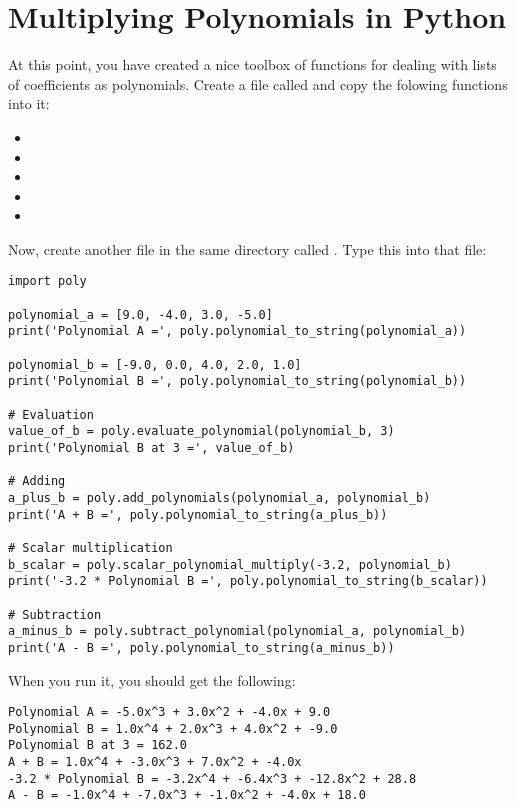 \chapter{Multiplying Polynomials in Python}

At this point, you have created a nice toolbox of functions for
dealing with lists of coefficients as polynomials. Create a file called  and copy the folowing functions into it:
\begin{itemize}
\item {}
\item {}
\item {}
\item {}
\item {}
\end{itemize}

Now, create another file in the same directory called . Type this into that file:
\begin{Verbatim}
import poly

polynomial_a = [9.0, -4.0, 3.0, -5.0]
print('Polynomial A =', poly.polynomial_to_string(polynomial_a))

polynomial_b = [-9.0, 0.0, 4.0, 2.0, 1.0]
print('Polynomial B =', poly.polynomial_to_string(polynomial_b))

# Evaluation
value_of_b = poly.evaluate_polynomial(polynomial_b, 3)
print('Polynomial B at 3 =', value_of_b)

# Adding
a_plus_b = poly.add_polynomials(polynomial_a, polynomial_b)
print('A + B =', poly.polynomial_to_string(a_plus_b))

# Scalar multiplication
b_scalar = poly.scalar_polynomial_multiply(-3.2, polynomial_b)
print('-3.2 * Polynomial B =', poly.polynomial_to_string(b_scalar))

# Subtraction
a_minus_b = poly.subtract_polynomial(polynomial_a, polynomial_b)
print('A - B =', poly.polynomial_to_string(a_minus_b))
\end{Verbatim}

When you run it, you should get the following:
\begin{Verbatim}
Polynomial A = -5.0x^3 + 3.0x^2 + -4.0x + 9.0
Polynomial B = 1.0x^4 + 2.0x^3 + 4.0x^2 + -9.0
Polynomial B at 3 = 162.0
A + B = 1.0x^4 + -3.0x^3 + 7.0x^2 + -4.0x
-3.2 * Polynomial B = -3.2x^4 + -6.4x^3 + -12.8x^2 + 28.8
A - B = -1.0x^4 + -7.0x^3 + -1.0x^2 + -4.0x + 18.0
\end{Verbatim}

